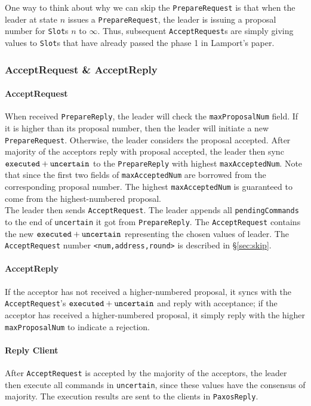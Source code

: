 \documentclass{article}
\numberwithin{equation}{section}
\begin{document}
One way to think about why we can skip the \verb|PrepareRequest| is that when the leader at state $n$ issues a \verb|PrepareRequest|, the leader is issuing a proposal number for \verb|Slot|s $n$ to $\infty$. Thus, subsequent \verb|AcceptRequest|s are simply giving values to \verb|Slot|s that have already passed the phase 1 in Lamport's paper.

\subsubsection{AcceptRequest \& AcceptReply}
\paragraph{AcceptRequest}When received \verb|PrepareReply|, the leader will check the \verb|maxProposalNum| field. If it is higher than its proposal number, then the leader will initiate a new \verb|PrepareRequest|. Otherwise, the leader considers the proposal accepted. After majority of the acceptors reply with proposal accepted, the leader then sync $\verb|executed|+\verb|uncertain|$ to the \verb|PrepareReply| with highest \verb|maxAcceptedNum|. Note that since the first two fields of \verb|maxAcceptedNum| are borrowed from the corresponding proposal number. The highest \verb|maxAcceptedNum| is guaranteed to come from the highest-numbered proposal.\\

The leader then sends \verb|AcceptRequest|. The leader appends all \verb|pendingCommands| to the end of \verb|uncertain| it got from \verb|PrepareReply|. The \verb|AcceptRequest| contains the new $\verb|executed|+\verb|uncertain|$ representing the chosen values of leader. The \verb|AcceptRequest| number \verb|<num,address,round>| is described in \S\ref{sec:skip}.

\paragraph{AcceptReply}If the acceptor has not received a higher-numbered proposal, it syncs with the \verb|AcceptRequest|'s $\verb|executed|+\verb|uncertain|$ and reply with acceptance; if the acceptor has received a higher-numbered proposal, it simply reply with the higher \verb|maxProposalNum| to indicate a rejection.

\paragraph{Reply Client}After \verb|AcceptRequest| is accepted by the majority of the acceptors, the leader then execute all commands in \verb|uncertain|, since these values have the consensus of majority. The execution results are sent to the clients in \verb|PaxosReply|.
\end{document}
